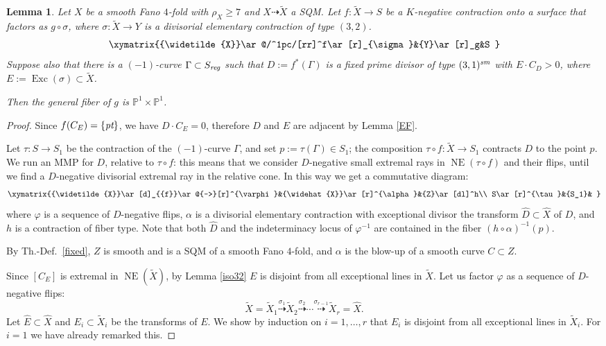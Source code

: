 \documentclass[a4paper,12pt]{amsart}
\newtheorem{lemma}[thm]{Lemma}
\theoremstyle{definition}
\numberwithin{figure}{section}
\numberwithin{table}{section}
\newcommand{\ph}{\varphi}
\newcommand{\w}{\widetilde}
\newcommand{\wi}{\widehat}
\newcommand{\pr}{\mathbb{P}}
\newcommand{\NE}{\operatorname{NE}}
\newcommand{\Exc}{\operatorname{Exc}}
\newcommand{\sm}{\text{\it sm}}
\newcommand{\pt}{\text{\it pt}}
\newcommand{\reg}{\text{\it reg}}
\begin{document}
  \begin{lemma}\label{quadric}
    Let $X$ be a smooth Fano $4$-fold with $\rho_X\geq 7$ and
 $X\dasharrow\w{X}$ a SQM. 
    Let  $f\colon\w{X} \to
    S$ be a $K$-negative contraction onto a surface that  factors as $g\circ\sigma$, where $\sigma\colon\w{X}\to Y$ is a divisorial elementary contraction  of type $(3,2)$.
    $$\xymatrix{{\w{X}}\ar@/^1pc/[rr]^f\ar[r]_{\sigma}&{Y}\ar[r]_g&S
    }$$
    Suppose also that there is a $(-1)$-curve $\Gamma\subset S_{\reg}$ such that $D:=f^*(\Gamma)$ is a fixed prime divisor of type $(3,1)^{\sm}$ with $E\cdot C_D>0$, where $E:=\Exc(\sigma)\subset\w{X}$.

    Then the general fiber of $g$ is $\pr^1\times\pr^1$.
\end{lemma}
\begin{proof}
Since $f(C_E)=\{\pt\}$, we have $D\cdot C_E=0$, therefore $D$ and $E$ are adjacent by Lemma \ref{EF}.
  
Let $\tau\colon S\to S_1$ be the contraction of the $(-1)$-curve $\Gamma$, and set $p:=\tau(\Gamma)\in S_1$; the composition $\tau\circ f\colon\w{X}\to S_1$ contracts ${D}$ to the point $p$.   We run an MMP for ${D}$, relative to $\tau\circ f$: this means that we consider $D$-negative small extremal rays in $\NE(\tau\circ f)$ and their flips, until we find a $D$-negative divisorial extremal ray in the relative cone. In this way 
we get a commutative diagram:
$$\xymatrix{{\w{X}}\ar[d]_{{f}}\ar@{-->}[r]^{\ph}&{\wi{X}}\ar[r]^{\alpha}&{Z}\ar[dl]^h\\
S\ar[r]^{\tau}&{S_1}&  }$$
where $\ph$ is a sequence of $D$-negative flips, $\alpha$ is a divisorial elementary contraction with exceptional divisor the transform $\wi{D}\subset\wi{X}$ of $D$, and $h$ is a contraction of fiber type. Note that both $\wi{D}$ and the indeterminacy locus of $\ph^{-1}$ are  contained in the fiber $(h\circ\alpha)^{-1}(p)$.

By Th.-Def.~\ref{fixed}, $Z$ is smooth and is a SQM of a smooth Fano $4$-fold, and  
 $\alpha$ is the blow-up of a smooth curve $C\subset Z$.

 Since $[C_E]$ is extremal in $\NE(\w{X})$, by Lemma \ref{iso32} $E$ is  disjoint from all exceptional lines in $\w{X}$.
 Let us factor $\ph$ as a sequence of $D$-negative flips:
$$\w{X}=\w{X}_1\stackrel{\sigma_1}{\dasharrow} \w{X}_2\stackrel{\sigma_2}{\dasharrow}\cdots\stackrel{\sigma_{r-1}}{\dasharrow}
\w{X}_r=\wi{X}.$$
Let $\wi{E}\subset\wi{X}$ and $E_i\subset\w{X}_i$ be the transforms of $E$.
We show by induction on $i=1,\dotsc,r$ that $E_i$ is disjoint from all exceptional lines in $\w{X}_{i}$. For $i=1$ we have already remarked this.


\end{proof}
\end{document}
